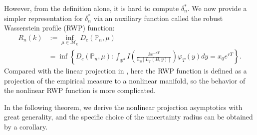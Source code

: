 \documentclass[11pt]{article}
\theoremstyle{definition}
\begin{document}
However, from the definition alone, it is hard to compute $\delta^*_n$. We now provide a simpler representation for $\delta^*_n$ via an auxiliary function called the robust Wasserstein profile (RWP) function:
\begin{align*}
R_n(k)&:=\inf_{\mu \in \mathcal{M}_{k}}D_c(\mathbb{P}_n, \mu) \\
&=\inf\left\{D_c(\mathbb{P}_n, \mu): \int_{\mathbb{R}^d }I\left(\frac{ke^{-rT}}{\mathbb{E}_{\mu}\left[L_T(B,y)\right]}\right)\varphi_T(y)dy = x_0e^{rT}\right\}.    
\end{align*}
Compared with the linear projection in \cite{BKW19}, here the RWP function is defined as a projection of the empirical measure to a nonlinear manifold, so the behavior of the nonlinear RWP function is more complicated. 

In the following theorem, we derive the nonlinear projection asymptotics with great generality, and the specific choice of the uncertainty radius can be obtained by a corollary. 
\end{document}
